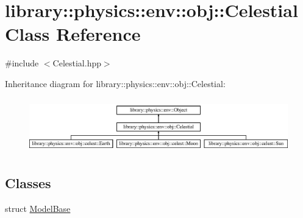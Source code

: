 \hypertarget{classlibrary_1_1physics_1_1env_1_1obj_1_1_celestial}{}\section{library\+:\+:physics\+:\+:env\+:\+:obj\+:\+:Celestial Class Reference}
\label{classlibrary_1_1physics_1_1env_1_1obj_1_1_celestial}


{\ttfamily \#include $<$Celestial.\+hpp$>$}

Inheritance diagram for library\+:\+:physics\+:\+:env\+:\+:obj\+:\+:Celestial\+:\begin{figure}[H]
\begin{center}
\leavevmode
\includegraphics[height=2.403433cm]{classlibrary_1_1physics_1_1env_1_1obj_1_1_celestial}
\end{center}
\end{figure}
\subsection*{Classes}
\begin{DoxyCompactItemize}
\item 
struct \hyperlink{structlibrary_1_1physics_1_1env_1_1obj_1_1_celestial_1_1_model_base}{Model\+Base}
\end{DoxyCompactItemize}
